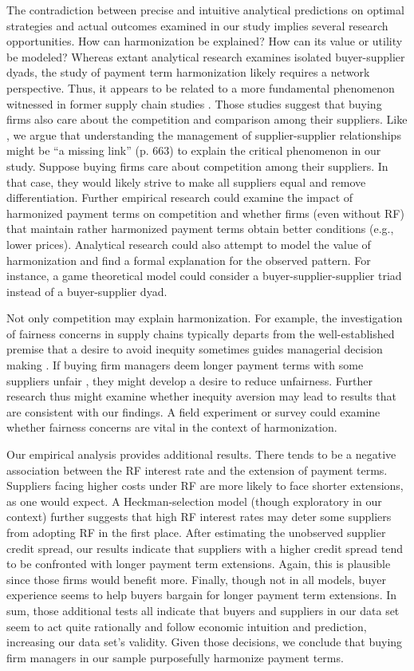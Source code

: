 \documentclass[A4,11pt]{article}
\renewcommand{\~}[1]{\tilde{#1}}
\renewcommand{\-}[1]{\overline{#1}}
\begin{document}
The contradiction between precise and intuitive analytical predictions on optimal strategies and actual outcomes examined in our study implies several research opportunities. How can harmonization be explained? How can its value or utility be modeled? Whereas extant analytical research examines isolated buyer-supplier dyads, the study of payment term harmonization likely requires a network perspective. Thus, it appears to be related to a more fundamental phenomenon witnessed in former supply chain studies \citep[e.g.,][]{Wu2005, wu2010, Wilhelm2011}. Those studies suggest that buying firms also care about the competition and comparison among their suppliers. Like \citet{Wilhelm2011}, we argue that understanding the management of supplier-supplier relationships might be ``a missing link'' (p. 663) to explain the critical phenomenon in our study. Suppose buying firms care about competition among their suppliers. In that case, they would likely strive to make all suppliers equal and remove differentiation. Further empirical research could examine the impact of harmonized payment terms on competition and whether firms (even without RF) that maintain rather harmonized payment terms obtain better conditions (e.g., lower prices). Analytical research could also attempt to model the value of harmonization and find a formal explanation for the observed pattern. For instance, a game theoretical model could consider a buyer-supplier-supplier triad instead of a buyer-supplier dyad.

Not only competition may explain harmonization. For example, the investigation of fairness concerns in supply chains \citep{Cui2012, Cui2007} typically departs from the well-established premise that a desire to avoid inequity sometimes guides managerial decision making \citep{Fehr1999}. If  buying firm managers deem longer payment terms with some suppliers unfair \citep{Schleper2017}, they might develop a desire to reduce unfairness. Further research thus might examine whether inequity aversion may lead to results that are consistent with our findings. A field experiment or survey could examine whether fairness concerns are vital in the context of harmonization. 

Our empirical analysis provides additional results. There tends to be a negative association between the RF interest rate and the extension of payment terms. Suppliers facing higher costs under RF are more likely to face shorter extensions, as one would expect. A Heckman-selection model (though exploratory in our context) further suggests that high RF interest rates may deter some suppliers from adopting RF in the first place. After estimating the unobserved supplier credit spread, our results indicate that suppliers with a higher credit spread tend to be confronted with longer payment term extensions. Again, this is plausible since those firms would benefit more. Finally, though not in all models, buyer experience seems to help buyers bargain for longer payment term extensions. In sum, those additional tests all indicate that buyers and suppliers in our data set seem to act quite rationally and follow economic intuition and prediction, increasing our data set's validity. Given those decisions, we conclude that buying firm managers in our sample purposefully harmonize payment terms.
\end{document}

